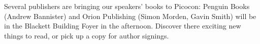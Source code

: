 Several publishers are bringing our speakers' books to Picocon:
Penguin Books (Andrew Bannister) and Orion Publishing (Simon Morden,
Gavin Smith) will be in the Blackett Building Foyer in the afternoon.
Discover there exciting new things to read, or pick up a copy for
author signings.
